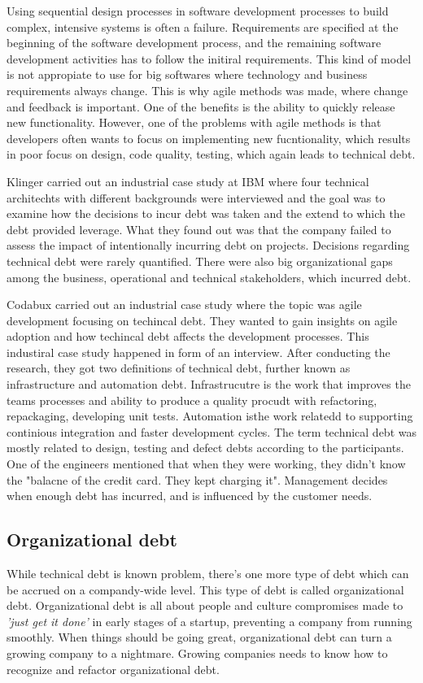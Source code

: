 Using sequential design processes in software development processes to build complex, intensive systems is often a failure. Requirements are specified at the beginning of the software development process, and the remaining software development activities has to follow the initiral requirements. This kind of model is not appropiate to use for big softwares where technology and business requirements always change. This is why agile methods was made, where change and feedback is important. One of the benefits is the ability to quickly release new functionality. However, one of the problems with agile methods is that developers often wants to focus on implementing new fucntionality, which results in poor focus on design, code quality, testing, which again leads to technical debt.  

Klinger carried out an industrial case study at IBM where four technical architechts with different backgrounds were interviewed and the goal was to examine how the decisions to incur debt was taken and the extend to which the debt provided leverage\cite{p35-klinger}. What they found out was that the company failed to assess the impact of intentionally incurring debt on projects. Decisions regarding technical debt were rarely quantified. There were also big organizational gaps among the business, operational and technical stakeholders, which incurred debt.

Codabux carried out an industrial case study where the topic was agile development focusing on techincal debt\cite{p8-codabux}. They wanted to gain insights on agile adoption and how techincal debt affects the development processes. This industiral case study happened in form of an interview. After conducting the research, they got two definitions of technical debt, further known as infrastructure and automation debt. Infrastrucutre is the work that improves the teams processes and ability to produce a quality procudt with refactoring, repackaging, developing unit tests. Automation isthe work relatedd to supporting continious integration and faster development cycles. The term technical debt was mostly related to design, testing and defect debts according to the participants. One of the engineers mentioned that when they were working, they didn't know the "balacne of the credit card. They kept charging it". Management decides when enough debt has incurred, and is influenced by the customer needs.



\subsection{Organizational debt}
While technical debt is known problem, there's one more type of debt which can be accrued on a compandy-wide level. This type of debt is called organizational debt. Organizational debt is all about people and culture compromises made to \textit{'just get it done'} in early stages of a startup, preventing a company from running smoothly\cite{steve-blank}. When things should be going great, organizational debt can turn a growing company to a nightmare. Growing companies needs to know how to recognize and refactor organizational debt. 

